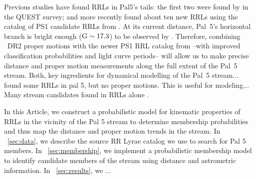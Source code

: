 \documentclass[twocolumn]{aastex63}
\begin{document}
Previous studies have found RRLs in Pal5's tails: the first two were found by \citet{Vivas:2001} in the QUEST survey; and more recently \citep{Ibata:2017} found about ten new RRLs using the catalog of PS1 candidate RRLs from \citet{Hernitschek:2016}. At its current distance, Pal~5's horizontal branch is bright enough (${\mathrm{G}}\sim17.3$) to be observed by \Gaia. Therefore, combining \Gaia~DR2 proper motions with the newer PS1 RRL catalog from \citet{Sesar:2017b} --with improved classification probabilities and light curve periods--  will allow us to make precise distance and proper motion measurements along the full extent of the Pal~5 stream. Both, key ingredients for dynamical modelling of the Pal~5 stream...
\citep{Ibata:2017} found some RRLs in pal 5, but no proper motions.
This is useful for modeling...
Many stream candidates found in RRLs alone \citep{Mateu:2018}.


In this Article, we construct a probabilistic model for kinematic properties of RRLs in the vicinity of the Pal 5 stream to determine membership probabilities and thus map the distance and proper motion trends in the stream.
In \sectionname~\ref{sec:data}, we describe the source RR Lyrae catalog we use to search for Pal 5 members.
In \sectionname~\ref{sec:membership}, we implement a probabilistic membership model to identify candidate members of the stream using distance and astrometric information.
In \sectionname~\ref{sec:results}, we ...
\end{document}
